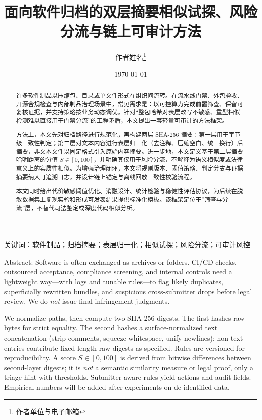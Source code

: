 \documentclass[UTF8,a4paper,zihao=5]{ctexart}
\title{面向软件归档的双层摘要相似试探、风险分流与链上可审计方法}
\author{作者姓名\thanks{作者单位与电子邮箱}}
\date{\today}
\begin{document}
\maketitle
\vspace{-0.6\baselineskip}

\begin{abstract}
许多软件制品以压缩包、目录或单文件形式在组织间流转。在流水线门禁、外包验收、开源合规检查与内部制品治理场景中，常见需求是：以可控算力完成前置筛查、保留可复核证据，并支持策略按业务动态调优。针对“整包哈希对表层改写不敏感、重型相似检测难以直接用于门禁分流”的工程矛盾，本文提出一套轻量可审计的方法框架。

方法上，本文先对归档路径进行规范化，再构建两层 SHA-256 摘要：第一层用于字节级一致性判定；第二层对文本内容进行表层归一化（去注释、压缩空白、统一换行）后摘要，非文本文件以固定格式引入原始内容摘要。进一步地，本文定义基于第二层摘要哈明距离的分值 $S\in[0,100]$，并明确其仅用于风险分流，不解释为语义相似度或法律意义上的实质性相似。为增强治理闭环，本文将规则版本、阈值策略、判定分支与证据摘要纳入可追溯日志，并设计链上锚定与离线回放一致性校验流程。

本文同时给出代价敏感阈值优化、消融设计、统计检验与稳健性评估协议，为后续在脱敏数据集上复现实验和形成可发表结果提供标准化模板。该框架定位于“筛查与分流”层，不替代司法鉴定或深度代码相似分析。
\end{abstract}

\noindent 关键词：软件制品；归档摘要；表层归一化；相似试探；风险分流；可审计风控

\vspace{0.35em}
\noindent Abstract:
Software is often exchanged as archives or folders. CI/CD checks, outsourced acceptance, compliance screening, and internal controls need a lightweight way---with logs and tunable rules---to flag likely duplicates, superficially rewritten bundles, and suspicious cross-submitter drops before legal review. We do \emph{not} issue final infringement judgments.

We normalize paths, then compute two SHA-256 digests. The first hashes raw bytes for strict equality. The second hashes a surface-normalized text concatenation (strip comments, squeeze whitespace, unify newlines); non-text entries contribute fixed-length raw digests as specified. Rules are versioned for reproducibility. A score $S\in[0,100]$ is derived from bitwise differences between second-layer digests; it is \emph{not} a semantic similarity measure or legal proof, only a triage hint with thresholds. Submitter-aware rules yield actions and audit fields. Empirical numbers will be added after experiments on de-identified data.
\end{document}
